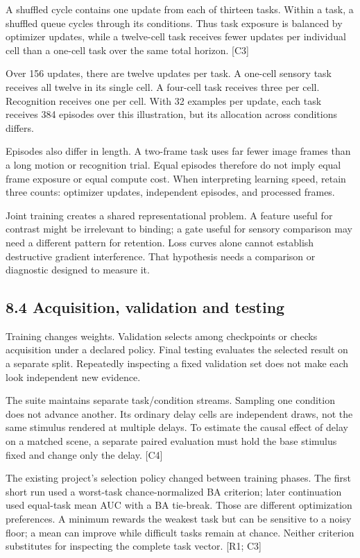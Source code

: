 \documentclass[
  11pt,
]{article}
\let\oldsubsection\subsection
\renewcommand{\subsection}{\Needspace{6\baselineskip}\oldsubsection}
\begin{document}
A shuffled cycle contains one update from each of thirteen tasks. Within
a task, a shuffled queue cycles through its conditions. Thus task
exposure is balanced by optimizer updates, while a twelve-cell task
receives fewer updates per individual cell than a one-cell task over the
same total horizon. {[}C3{]}

Over 156 updates, there are twelve updates per task. A one-cell sensory
task receives all twelve in its single cell. A four-cell task receives
three per cell. Recognition receives one per cell. With 32 examples per
update, each task receives 384 episodes over this illustration, but its
allocation across conditions differs.

Episodes also differ in length. A two-frame task uses far fewer image
frames than a long motion or recognition trial. Equal episodes therefore
do not imply equal frame exposure or equal compute cost. When
interpreting learning speed, retain three counts: optimizer updates,
independent episodes, and processed frames.

Joint training creates a shared representational problem. A feature
useful for contrast might be irrelevant to binding; a gate useful for
sensory comparison may need a different pattern for retention. Loss
curves alone cannot establish destructive gradient interference. That
hypothesis needs a comparison or diagnostic designed to measure it.

\subsection{8.4 Acquisition, validation and
testing}\label{acquisition-validation-and-testing}

Training changes weights. Validation selects among checkpoints or checks
acquisition under a declared policy. Final testing evaluates the
selected result on a separate split. Repeatedly inspecting a fixed
validation set does not make each look independent new evidence.

The suite maintains separate task/condition streams. Sampling one
condition does not advance another. Its ordinary delay cells are
independent draws, not the same stimulus rendered at multiple delays. To
estimate the causal effect of delay on a matched scene, a separate
paired evaluation must hold the base stimulus fixed and change only the
delay. {[}C4{]}

The existing project's selection policy changed between training phases.
The first short run used a worst-task chance-normalized BA criterion;
later continuation used equal-task mean AUC with a BA tie-break. Those
are different optimization preferences. A minimum rewards the weakest
task but can be sensitive to a noisy floor; a mean can improve while
difficult tasks remain at chance. Neither criterion substitutes for
inspecting the complete task vector. {[}R1; C3{]}
\end{document}
